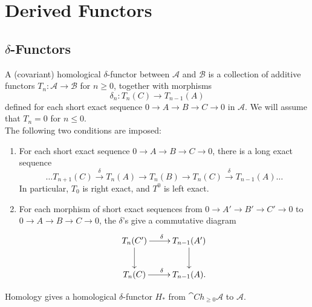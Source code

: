 \section{Derived Functors}

\subsection{$\delta$-Functors}

\begin{definition}
	A (covariant) homological $\delta$-functor between $\mathcal{A}$ and $\mathcal{B}$ is a collection of additive functors $T_n:\mathcal{A}\rightarrow\mathcal{B}$ for $n\geq0$, together with morphisms
	$$\delta_n:T_n(C)\rightarrow T_{n-1}(A)$$
	defined for each short exact sequence $0\rightarrow A \rightarrow B \rightarrow C \rightarrow 0$ in $\mathcal{A}$.
	We will assume that $T_n = 0$ for $n\leq 0$. \\
	The following two conditions are imposed:
	\begin{enumerate}[label=\arabic*.]
		\item For each short exact sequence $0 \rightarrow A \rightarrow B \rightarrow C \rightarrow 0$, there is a long exact sequence
		$$\dots T_{n+1}(C) \overset{\delta}{\rightarrow} T_n(A) \rightarrow T_n(B) \rightarrow T_n(C) \overset{\delta}{\rightarrow} T_{n-1}(A) \dots$$
		In particular, $T_0$ is right exact, and $T^0$ is left exact.
		
		\item For each morphism of short exact sequences from $0 \rightarrow A' \rightarrow B' \rightarrow C' \rightarrow 0$ to $0 \rightarrow A \rightarrow B \rightarrow C \rightarrow 0$, the $\delta$'s give a commutative diagram
		\begin{align*}
			\begin{gathered}
				\xymatrixcolsep{5pc}\xymatrixcolsep{2pc}\xymatrix{
				T_n(C') \ar[r]^{\delta} \ar[d] & T_{n-1}(A') \ar[d] \\
				T_n(C) \ar[r]^{\delta} & T_{n-1}(A). }
			\end{gathered}
		\end{align*}
	\end{enumerate}
\end{definition}

\begin{example}
	Homology gives a homological $\delta$-functor $H_*$ from $\cat{Ch_{\geq0}}{\mathcal{A}}$ to $\mathcal{A}$.
\end{example}

